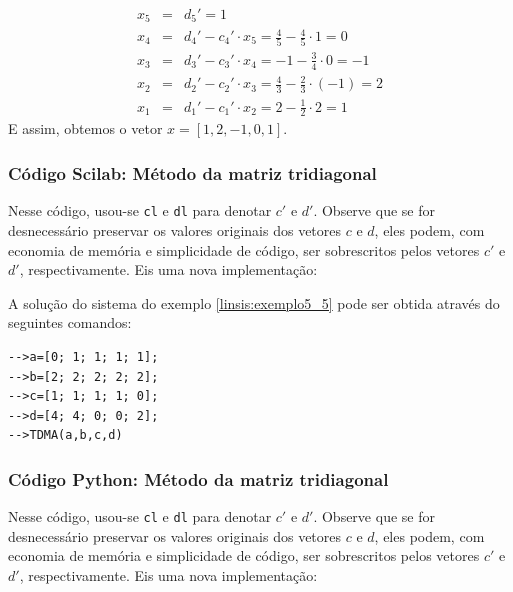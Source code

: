 \begin{ex}
\begin{eqnarray*}
 x_5&=&d_5'=1\\
 x_4&=&d_4'-c_4'\cdot x_5=\frac{4}{5}-\frac{4}{5}\cdot 1 = 0\\
 x_3&=&d_3'-c_3'\cdot x_4=-1-\frac{3}{4}\cdot 0 = -1\\
 x_2&=&d_2'-c_2'\cdot x_3=\frac{4}{3}-\frac{2}{3}\cdot (-1) = 2\\
 x_1&=&d_1'-c_1'\cdot x_2=2-\frac{1}{2}\cdot 2 = 1
 \end{eqnarray*}
E assim, obtemos o vetor $x=[1, 2, -1, 0, 1]$.
\end{ex}


\ifisscilab
\subsubsection{Código Scilab: Método da matriz tridiagonal}



Nesse código, usou-se \verb+cl+ e \verb+dl+ para denotar $c'$ e $d'$. Observe que se for desnecessário preservar os valores originais dos vetores $c$ e $d$, eles podem, com economia de memória e simplicidade de código, ser sobrescritos pelos vetores $c'$ e $d'$, respectivamente. Eis uma nova implementação:



A solução do sistema do exemplo \ref{linsis:exemplo5_5} pode ser obtida através do seguintes comandos:
\begin{verbatim}
-->a=[0; 1; 1; 1; 1];
-->b=[2; 2; 2; 2; 2];
-->c=[1; 1; 1; 1; 0];
-->d=[4; 4; 0; 0; 2];
-->TDMA(a,b,c,d)
\end{verbatim}

\fi


\ifispython
\subsubsection{Código Python: Método da matriz tridiagonal}



Nesse código, usou-se \verb+cl+ e \verb+dl+ para denotar $c'$ e $d'$. Observe que se for desnecessário preservar os valores originais dos vetores $c$ e $d$, eles podem, com economia de memória e simplicidade de código, ser sobrescritos pelos vetores $c'$ e $d'$, respectivamente. Eis uma nova implementação:

